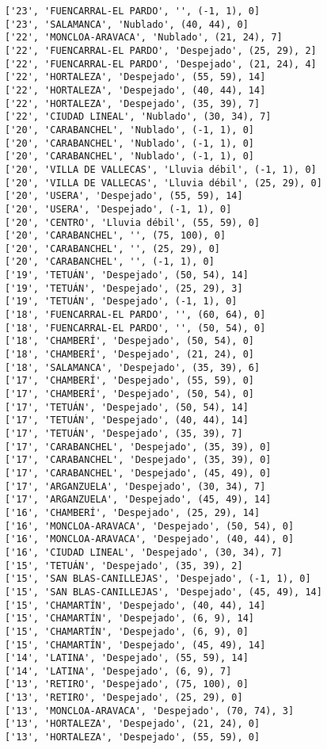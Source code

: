 \documentclass[11pt]{article}
\begin{document}
\begin{Verbatim}[commandchars=\\\{\}]
['23', 'FUENCARRAL-EL PARDO', '', (-1, 1), 0]
['23', 'SALAMANCA', 'Nublado', (40, 44), 0]
['22', 'MONCLOA-ARAVACA', 'Nublado', (21, 24), 7]
['22', 'FUENCARRAL-EL PARDO', 'Despejado', (25, 29), 2]
['22', 'FUENCARRAL-EL PARDO', 'Despejado', (21, 24), 4]
['22', 'HORTALEZA', 'Despejado', (55, 59), 14]
['22', 'HORTALEZA', 'Despejado', (40, 44), 14]
['22', 'HORTALEZA', 'Despejado', (35, 39), 7]
['22', 'CIUDAD LINEAL', 'Nublado', (30, 34), 7]
['20', 'CARABANCHEL', 'Nublado', (-1, 1), 0]
['20', 'CARABANCHEL', 'Nublado', (-1, 1), 0]
['20', 'CARABANCHEL', 'Nublado', (-1, 1), 0]
['20', 'VILLA DE VALLECAS', 'Lluvia débil', (-1, 1), 0]
['20', 'VILLA DE VALLECAS', 'Lluvia débil', (25, 29), 0]
['20', 'USERA', 'Despejado', (55, 59), 14]
['20', 'USERA', 'Despejado', (-1, 1), 0]
['20', 'CENTRO', 'Lluvia débil', (55, 59), 0]
['20', 'CARABANCHEL', '', (75, 100), 0]
['20', 'CARABANCHEL', '', (25, 29), 0]
['20', 'CARABANCHEL', '', (-1, 1), 0]
['19', 'TETUÁN', 'Despejado', (50, 54), 14]
['19', 'TETUÁN', 'Despejado', (25, 29), 3]
['19', 'TETUÁN', 'Despejado', (-1, 1), 0]
['18', 'FUENCARRAL-EL PARDO', '', (60, 64), 0]
['18', 'FUENCARRAL-EL PARDO', '', (50, 54), 0]
['18', 'CHAMBERÍ', 'Despejado', (50, 54), 0]
['18', 'CHAMBERÍ', 'Despejado', (21, 24), 0]
['18', 'SALAMANCA', 'Despejado', (35, 39), 6]
['17', 'CHAMBERÍ', 'Despejado', (55, 59), 0]
['17', 'CHAMBERÍ', 'Despejado', (50, 54), 0]
['17', 'TETUÁN', 'Despejado', (50, 54), 14]
['17', 'TETUÁN', 'Despejado', (40, 44), 14]
['17', 'TETUÁN', 'Despejado', (35, 39), 7]
['17', 'CARABANCHEL', 'Despejado', (35, 39), 0]
['17', 'CARABANCHEL', 'Despejado', (35, 39), 0]
['17', 'CARABANCHEL', 'Despejado', (45, 49), 0]
['17', 'ARGANZUELA', 'Despejado', (30, 34), 7]
['17', 'ARGANZUELA', 'Despejado', (45, 49), 14]
['16', 'CHAMBERÍ', 'Despejado', (25, 29), 14]
['16', 'MONCLOA-ARAVACA', 'Despejado', (50, 54), 0]
['16', 'MONCLOA-ARAVACA', 'Despejado', (40, 44), 0]
['16', 'CIUDAD LINEAL', 'Despejado', (30, 34), 7]
['15', 'TETUÁN', 'Despejado', (35, 39), 2]
['15', 'SAN BLAS-CANILLEJAS', 'Despejado', (-1, 1), 0]
['15', 'SAN BLAS-CANILLEJAS', 'Despejado', (45, 49), 14]
['15', 'CHAMARTÍN', 'Despejado', (40, 44), 14]
['15', 'CHAMARTÍN', 'Despejado', (6, 9), 14]
['15', 'CHAMARTÍN', 'Despejado', (6, 9), 0]
['15', 'CHAMARTÍN', 'Despejado', (45, 49), 14]
['14', 'LATINA', 'Despejado', (55, 59), 14]
['14', 'LATINA', 'Despejado', (6, 9), 7]
['13', 'RETIRO', 'Despejado', (75, 100), 0]
['13', 'RETIRO', 'Despejado', (25, 29), 0]
['13', 'MONCLOA-ARAVACA', 'Despejado', (70, 74), 3]
['13', 'HORTALEZA', 'Despejado', (21, 24), 0]
['13', 'HORTALEZA', 'Despejado', (55, 59), 0]

\end{Verbatim}
\end{document}
